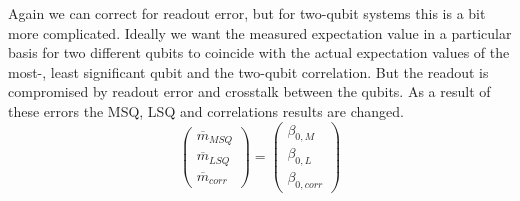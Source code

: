 Again we can correct for readout error, but for two-qubit systems this is a bit more complicated. Ideally we want the measured expectation value in a particular basis for two different qubits to coincide with the actual expectation values of the most-, least significant qubit and the two-qubit correlation. But the readout is compromised by readout error and crosstalk between the qubits. As a result of these errors the MSQ, LSQ and correlations results are changed.
\begin{equation}
\begin{pmatrix}
\overline{m}_{MSQ}  \\
\overline{m}_{LSQ}  \\
\overline{m}_{corr}
\end{pmatrix}=\begin{pmatrix}
\beta_{0,M}  \\
\beta_{0,L}  \\
\beta_{0,corr}
\end{pmatrix}
\end{equation}












 